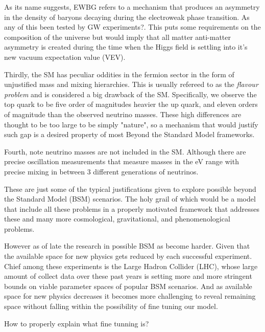 As its name suggests, EWBG refers to a mechanism that produces an asymmetry in the density of baryons decaying during the electroweak phase transition. {\color{red} As any of this been tested by GW experiments?}. This puts some requirements on the composition of the universe but would imply that all matter anti-matter asymmetry is created during the time when the Higgs field is settling into it's new vacuum expectation value (VEV). 

Thirdly, the SM has peculiar oddities in the fermion sector in the form of unjustified mass and mixing hierarchies. This is usually refereed to as the \textit{flavour problem} and is considered a big drawback of the SM. Specifically, we observe the top quark to be five order of magnitudes heavier the up quark, and eleven orders of magnitude than the observed neutrino masses. These high differences are thought to be too large to be simply "nature", so a mechanism that would justify such gap is a desired property of most Beyond the Standard Model frameworks. 

Fourth, note neutrino masses are not included in the 
SM. Although there are precise oscillation measurements that measure masses in the eV range with precise mixing in between 3 different generations of neutrinos. 

These are just some of the typical justifications given to explore possible beyond the Standard Model (BSM) scenarios. The holy grail of which would be a model that include all these problems in a properly motivated framework that addresses these and many more cosmological, gravitational, and phenomenological problems.  

However as of late the research in possible BSM as become harder. Given that the available space for new physics gets reduced by each successful experiment. Chief among these experiments is the Large Hadron Collider (LHC), whose large amount of collect data over these past years is setting more and more stringent bounds on viable parameter spaces of popular BSM scenarios. And as available space for new physics decreases it becomes more challenging to reveal remaining space without falling within the possibility of fine tuning our model.  

{\color{blue} How to properly explain what fine tunning is?}

